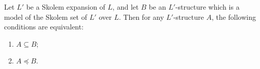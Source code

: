 Let $L'$ be a Skolem expansion of $L$, and let $B$ be an $L'$-structure which is a model of the Skolem set of $L'$ over $L$. Then for any $L'$-structure $A$, the following conditions are equivalent:

\begin{enumerate}
\item[(i)] $A \subseteq B$;
\item[(ii)] $A \preceq B$.
\end{enumerate}
